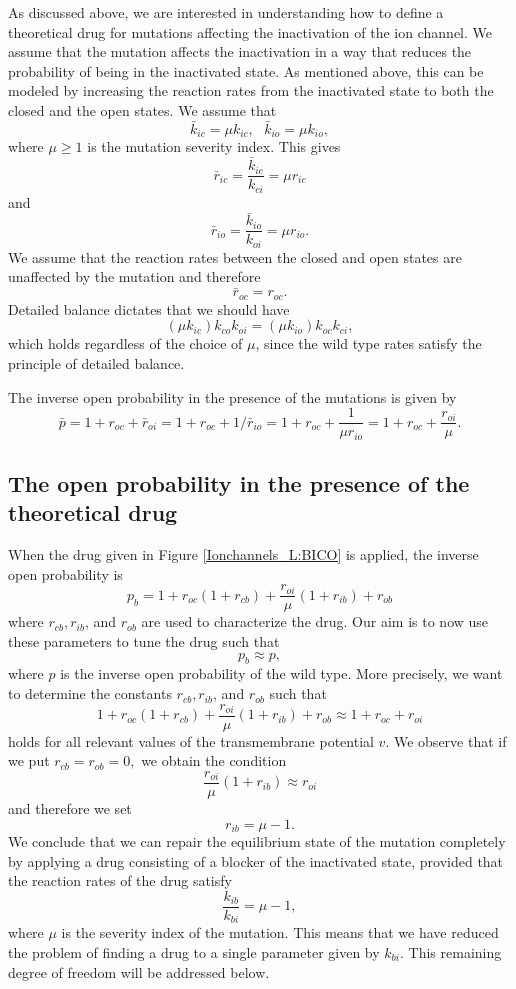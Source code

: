 As discussed above, we are interested in understanding how to define a
theoretical drug for mutations affecting the inactivation of the ion channel.
 We assume that the mutation affects the inactivation in a way that reduces the
probability of being in the inactivated state.  As mentioned above, this can be modeled by increasing
the reaction rates from the inactivated state to both the closed and the open states. We assume that
\[
\bar{k}_{ic}=\mu k_{ic},\text{ }\bar{k}_{io}=\mu k_{io},
\]
where $\mu\geqslant1$ is the mutation severity index.
This gives
\[
\bar{r}_{ic}=\frac{\bar{k}_{ic}}{k_{ci}}=\mu r_{ic}
\]
and
\[
\bar{r}_{io}=\frac{\bar{k}_{io}}{k_{oi}}=\mu r_{io}.
\]
We assume that the reaction rates between the closed and open states are
unaffected by the mutation and therefore
\[
\bar{r}_{oc}=r_{oc}.
\]
Detailed balance dictates that we should have
\[
(\mu k_{ic}) k_{co} k_{oi} = (\mu k_{io}) k_{oc} k_{ci},
\] 
which holds regardless of the choice of $\mu$, since the wild type rates satisfy the
principle of detailed balance.

The inverse open probability in the presence of the mutations is given by
\[
\bar{p}=1+r_{oc}+\bar{r}_{oi}=1+r_{oc}+1/\bar{r}_{io} =1+r_{oc}+\frac{1}{\mu r_{io}}
 = 1+r_{oc}+\frac{r_{oi}}{\mu}.
\]


\subsection{The open probability in the presence of the theoretical drug}

When the drug given in Figure \ref{Ionchannels_L:BICO} is applied, the inverse open probability is
\[
p_{b}=1+r_{oc}\left(  1+r_{cb}\right)  +\frac{r_{oi}}{\mu}\left(
1+r_{ib}\right)  +r_{ob}
\]
where $r_{cb},r_{ib}$, and $r_{ob}$ are used to characterize the drug. Our aim
is to now use these parameters to tune the drug such that
\[
p_{b}\approx p,
\]
where $p$ is the inverse open probability of the wild type. More precisely, we
want to determine the constants $r_{cb},r_{ib}$, and $r_{ob}$ such that
\[
1+r_{oc}\left(  1+r_{cb}\right)  +\frac{r_{oi}}{\mu}\left(  1+r_{ib}\right)
+r_{ob}\approx1+r_{oc}+r_{oi}
\]
holds for all relevant values of the transmembrane potential $v.$ We observe
that if we put $r_{cb}=r_{ob}=0,$ we obtain the condition
\[
\frac{r_{oi}}{\mu}\left(  1+r_{ib}\right)  \approx r_{oi}
\]
and therefore we set
\[
r_{ib}=\mu-1.
\]
We conclude that we can repair the equilibrium state of the mutation
completely by applying a drug consisting of a blocker of the inactivated
state, provided that the reaction rates of the drug satisfy
\[
\frac{k_{ib}}{k_{bi}}=\mu-1,
\]
where $\mu$ is the severity index of the mutation. This means that we have
reduced the problem of finding a drug to a single parameter given by
$k_{bi}.$ This remaining degree of freedom will be addressed below.


